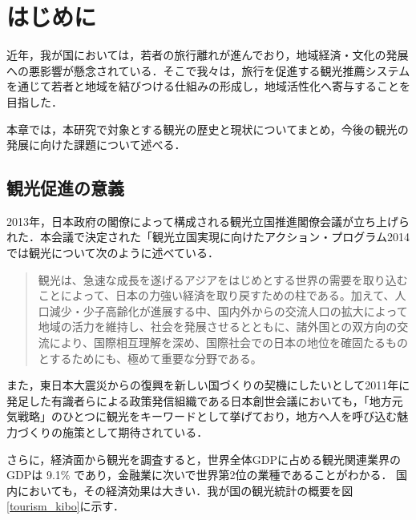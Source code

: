 \documentclass{jsarticle}
\begin{document}
\tableofcontents
\newpage
\listoftables
\newpage
\listoffigures
\newpage

\section{はじめに}

近年，我が国においては，若者の旅行離れが進んでおり，地域経済・文化の発展への悪影響が懸念されている．そこで我々は，旅行を促進する観光推薦システムを通じて若者と地域を結びつける仕組みの形成し，地域活性化へ寄与することを目指した．

本章では，本研究で対象とする観光の歴史と現状についてまとめ，今後の観光の発展に向けた課題について述べる．

\newpage

\subsection{観光促進の意義}

2013年，日本政府の閣僚によって構成される観光立国推進閣僚会議が立ち上げられた．本会議で決定された「観光立国実現に向けたアクション・プログラム2014\cite{action_program_2014}では観光について次のように述べている．

\begin{quote}
観光は、急速な成長を遂げるアジアをはじめとする世界の需要を取り込むことによって、日本の力強い経済を取り戻すための柱である。加えて、人口減少・少子高齢化が進展する中、国内外からの交流人口の拡大によって地域の活力を維持し、社会を発展させるとともに、諸外国との双方向の交流により、国際相互理解を深め、国際社会での日本の地位を確固たるものとするためにも、極めて重要な分野である。
\end{quote}

また，東日本大震災からの復興を新しい国づくりの契機にしたいとして2011年に発足した有識者らによる政策発信組織である日本創世会議においても，「地方元気戦略」のひとつに観光をキーワードとして挙げており，地方へ人を呼び込む魅力づくりの施策として期待されている\cite{nippon_sousei}．

さらに，経済面から観光を調査すると，世界全体GDPに占める観光関連業界のGDPは 9.1\% であり，金融業に次いで世界第2位の業種であることがわかる．
国内においても，その経済効果は大きい．我が国の観光統計の概要を図\ref{tourism_kibo}に示す．
\end{document}
